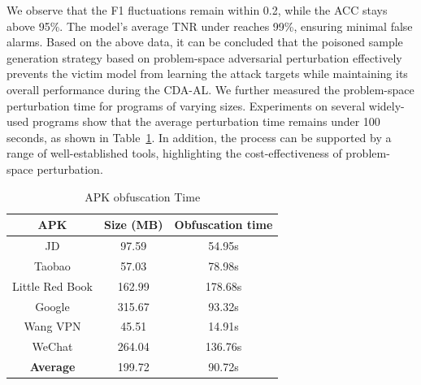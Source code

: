 We observe that the F1 fluctuations remain within 0.2, while the ACC stays above 95\%.
The model’s average TNR under \pandora reaches 99\%, ensuring minimal false alarms.
Based on the above data, it can be concluded that the poisoned sample generation strategy based on problem-space adversarial perturbation effectively prevents the victim model from learning the attack targets while maintaining its overall performance during the CDA-AL. 
We further measured the problem-space perturbation time for programs of varying sizes. Experiments on several widely-used programs show that the average perturbation time remains under 100 seconds, as shown in Table~\ref{tab: APK obfdxuscation time}.
In addition, the process can be supported by a range of well-established tools, highlighting the cost-effectiveness of problem-space perturbation.
\begin{table}[h!]
	\centering
	\small
	\renewcommand{\arraystretch}{0.8}
	\caption{APK obfuscation Time}
	\label{tab: APK obfdxuscation time}
	\begin{tabular}{c|c|c}
		\toprule
		\textbf{APK} & \textbf{Size (MB)} & \textbf{Obfuscation time} \\
		\midrule
		JD & 97.59 & 54.95s \\
		Taobao & 57.03 & 78.98s \\
		Little Red Book & 162.99 & 178.68s \\
		Google & 315.67 & 93.32s \\
		Wang VPN & 45.51 & 14.91s \\
		WeChat & 264.04 & 136.76s \\
		\midrule
		\textbf{Average} & 199.72 & 90.72s \\
		\bottomrule
	\end{tabular}
\end{table}


